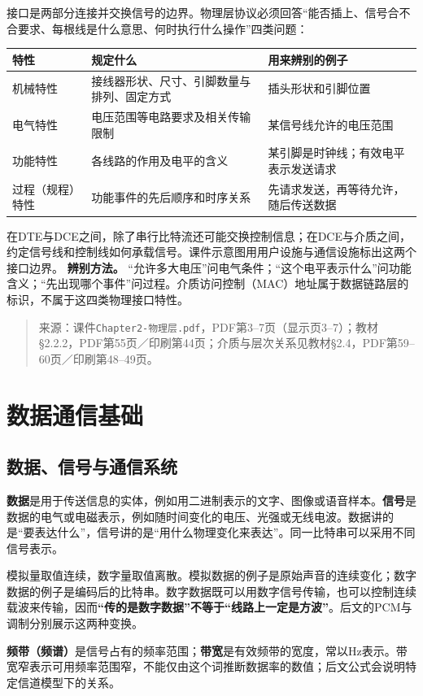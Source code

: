 接口是两部分连接并交换信号的边界。物理层协议必须回答“能否插上、信号合不合要求、每根线是什么意思、何时执行什么操作”四类问题：
\begin{center}
\begin{tabularx}{0.97\textwidth}{l X X}
\toprule
特性 & 规定什么 & 用来辨别的例子\\
\midrule
机械特性 & 接线器形状、尺寸、引脚数量与排列、固定方式 & 插头形状和引脚位置\\
电气特性 & 电压范围等电路要求及相关传输限制 & 某信号线允许的电压范围\\
功能特性 & 各线路的作用及电平的含义 & 某引脚是时钟线；有效电平表示发送请求\\
过程（规程）特性 & 功能事件的先后顺序和时序关系 & 先请求发送，再等待允许，随后传送数据\\
\bottomrule
\end{tabularx}
\end{center}
在DTE与DCE之间，除了串行比特流还可能交换控制信息；在DCE与介质之间，约定信号线和控制线如何承载信号。课件示意图用用户设施与通信设施标出这两个接口边界。
\textbf{辨别方法。} “允许多大电压”问电气条件；“这个电平表示什么”问功能含义；“先出现哪个事件”问过程。介质访问控制（MAC）地址属于数据链路层的标识，不属于这四类物理接口特性。

\begin{quote}\small 来源：课件\texttt{Chapter2-物理层.pdf}，PDF第3--7页（显示页3--7）；教材§2.2.2，PDF第55页／印刷第44页；介质与层次关系见教材§2.4，PDF第59--60页／印刷第48--49页。\end{quote}
\annotationarea[4]

\section{数据通信基础}
\subsection{数据、信号与通信系统}
\textbf{数据}是用于传送信息的实体，例如用二进制表示的文字、图像或语音样本。\textbf{信号}是数据的电气或电磁表示，例如随时间变化的电压、光强或无线电波。数据讲的是“要表达什么”，信号讲的是“用什么物理变化来表达”。同一比特串可以采用不同信号表示。

模拟量取值连续，数字量取值离散。模拟数据的例子是原始声音的连续变化；数字数据的例子是编码后的比特串。数字数据既可以用数字信号传输，也可以控制连续载波来传输，因而\textbf{“传的是数字数据”不等于“线路上一定是方波”}。后文的PCM与调制分别展示这两种变换。

\textbf{频带（频谱）}是信号占有的频率范围；\textbf{带宽}是有效频带的宽度，常以Hz表示。带宽窄表示可用频率范围窄，不能仅由这个词推断数据率的数值；后文公式会说明特定信道模型下的关系。

